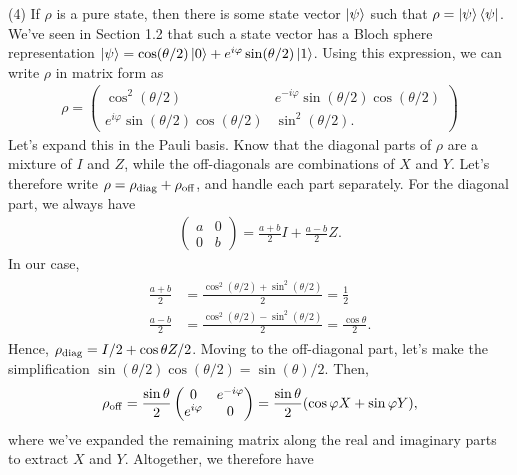 \documentclass{book}
\begin{document}
    (4) If $\rho$ is a pure state, then there is some state vector $\ket{\psi}$ such that $\rho = \ket{\psi}\bra{\psi}$. We've seen in Section 1.2 that such a state vector has a Bloch sphere representation $\ket{\psi} = \cos(\theta/2) \ket{0} + e^{i\varphi} \sin(\theta/2)\ket{1}$. Using this expression, we can write $\rho$ in matrix form as
    \begin{align}
        \rho = \begin{pmatrix}
            \cos^2 (\theta/2) & e^{-i\varphi} \sin(\theta/2)\cos(\theta/2) \\
            e^{i\varphi} \sin(\theta/2)\cos(\theta/2) & \sin^2(\theta/2).
        \end{pmatrix}
    \end{align}
    Let's expand this in the Pauli basis. Know that the diagonal parts of $\rho$ are a mixture of $I$ and $Z$, while the off-diagonals are combinations of $X$ and $Y$. Let's therefore write $\rho = \rho_{\rm diag} + \rho_{\rm off}$, and handle each part separately. For the diagonal part, we always have
    \begin{align}
        \begin{pmatrix}
            a & 0 \\
            0 & b
        \end{pmatrix} = 
            \frac{a+b}{2} I + \frac{a-b}{2} Z.
    \end{align}
    In our case,
    \begin{align}
    \begin{aligned}
        \frac{a+b}{2} &= \frac{\cos^2 (\theta/2) + \sin^2 (\theta/2)}{2} = \frac{1}{2} \\
        \frac{a-b}{2} &= \frac{\cos^2 (\theta/2) - \sin^2 (\theta/2)}{2} = \frac{\cos\theta}{2}.
    \end{aligned}
    \end{align}
    Hence, $\rho_{\rm diag} = I/2 + \cos\theta Z/2$. Moving to the off-diagonal part, let's make the simplification $\sin(\theta/2)\cos(\theta/2) = \sin(\theta)/2$. Then,
    \begin{align}
        \rho_{\rm off} = \frac{\sin\theta}{2} \begin{pmatrix}
            0 & e^{-i\varphi} \\
            e^{i\varphi} & 0
        \end{pmatrix} = \frac{\sin\theta}{2} (\cos\varphi X + \sin\varphi Y),
    \end{align}
    where we've expanded the remaining matrix along the real and imaginary parts to extract $X$ and $Y$. Altogether, we therefore have
\end{document}
